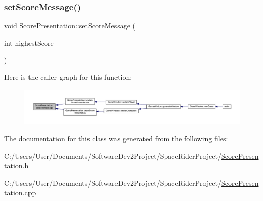 \subsubsection{\texorpdfstring{set\+Score\+Message()}{setScoreMessage()}}
{\footnotesize\ttfamily void Score\+Presentation\+::set\+Score\+Message (\begin{DoxyParamCaption}\item[{int}]{highest\+Score }\end{DoxyParamCaption})}

Here is the caller graph for this function\+:\nopagebreak
\begin{figure}[H]
\begin{center}
\leavevmode
\includegraphics[width=350pt]{class_score_presentation_adf2c954da3e73d5adbe0e8d30243ee25_icgraph}
\end{center}
\end{figure}


The documentation for this class was generated from the following files\+:\begin{DoxyCompactItemize}
\item 
C\+:/\+Users/\+User/\+Documents/\+Software\+Dev2\+Project/\+Space\+Rider\+Project/\hyperlink{_score_presentation_8h}{Score\+Presentation.\+h}\item 
C\+:/\+Users/\+User/\+Documents/\+Software\+Dev2\+Project/\+Space\+Rider\+Project/\hyperlink{_score_presentation_8cpp}{Score\+Presentation.\+cpp}\end{DoxyCompactItemize}
